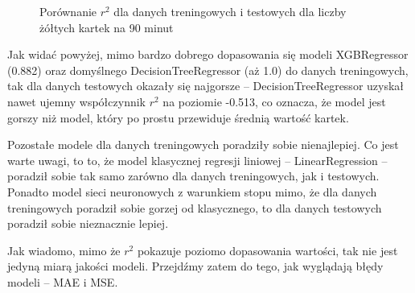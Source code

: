 \documentclass{article}
\begin{document}
\begin{figure}[H]
\begin{minipage}[b]{0.5\textwidth}
    \label{fig:all_r2_test1}
  \end{minipage}
  \captionsetup{justification=centering}
  \caption{Porównanie $r^2$ dla danych treningowych i testowych dla liczby żółtych kartek na 90 minut}
  \label{fig:all_r2_1}
\end{figure}

Jak widać powyżej, mimo bardzo dobrego dopasowania się modeli XGBRegressor (0.882) oraz domyślnego DecisionTreeRegressor (aż 1.0) do danych treningowych, tak dla danych testowych okazały się najgorsze – DecisionTreeRegressor uzyskał nawet ujemny współczynnik $r^2$  na poziomie -0.513, co oznacza, że model jest gorszy niż model, który po prostu przewiduje średnią wartość kartek.

Pozostałe modele dla danych treningowych poradziły sobie nienajlepiej. Co jest warte uwagi, to to, że model klasycznej regresji liniowej – LinearRegression – poradził sobie tak samo zarówno dla danych treningowych, jak i testowych. Ponadto model sieci neuronowych z warunkiem stopu mimo, że dla danych treningowych poradził sobie gorzej od klasycznego, to dla danych testowych poradził sobie nieznacznie lepiej.

Jak wiadomo, mimo że $r^2$ pokazuje poziomo dopasowania wartości, tak nie jest jedyną miarą jakości modeli. Przejdźmy zatem do tego, jak wyglądają błędy modeli – MAE i MSE.
\end{document}
